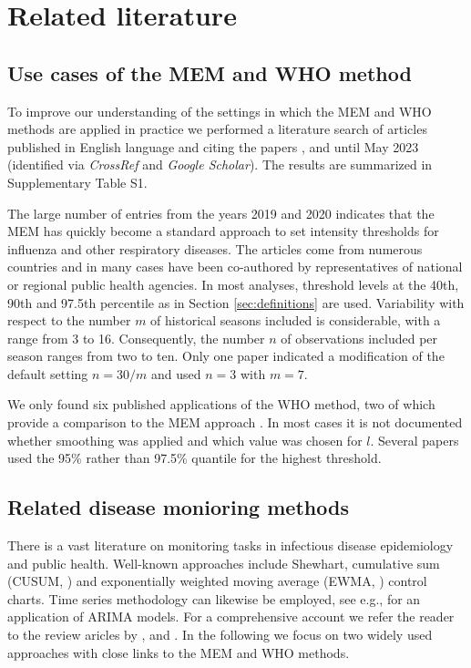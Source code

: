 \documentclass[12pt]{article}
\begin{document}
\section{Related literature}
\label{sec:review}

\subsection{Use cases of the MEM and WHO method}


To improve our understanding of the settings in which the MEM and WHO methods are applied in practice we performed a literature search of articles published in English language and citing the papers \cite{Vega2015}, \cite{WHO2014} and \cite{WHO2017} until May 2023 (identified via \textit{CrossRef} and \textit{Google Scholar}). The results are summarized in Supplementary Table S1.

The large number of entries from the years 2019 and 2020 indicates that the MEM has quickly become a standard approach to set intensity thresholds for influenza and other respiratory diseases. The articles come from numerous countries and in many cases have been co-authored by representatives of national or regional public health agencies. In most analyses, threshold levels at the 40th, 90th and 97.5th percentile as in Section \ref{sec:definitions} are used. Variability with respect to the number $m$ of historical seasons included is considerable, with a range from 3 to 16. Consequently, the number $n$ of observations included per season ranges from two to ten. Only one paper \citep{Dahlgren2022} indicated a modification of the default setting $n = 30/m$  and used $n = 3$ with $m = 7$.

We only found six published applications of the WHO method, two of which provide a comparison to the MEM approach \citep{Rguig2020, Teeluck2021}. In most cases it is not documented whether smoothing was applied and which value was chosen for $l$. Several papers used the 95\% rather than 97.5\% quantile for the highest threshold.



\subsection{Related disease monioring methods}
\label{sec:related_literature}


There is a vast literature on monitoring tasks in infectious disease epidemiology and public health. Well-known approaches include Shewhart, cumulative sum (CUSUM, \citealt{Hoehle2008}) and exponentially weighted moving average (EWMA, \citealt{Steiner2010}) control charts. Time series methodology can likewise be employed, see e.g., \cite{Reis2003} for an application of ARIMA models. For a comprehensive account we refer the reader to the review aricles by \cite{Allevius2020}, \cite{Rigdon2015} and \cite{Unkel2012}. In the following we focus on two widely used approaches with close links to the MEM and WHO methods.
\end{document}
